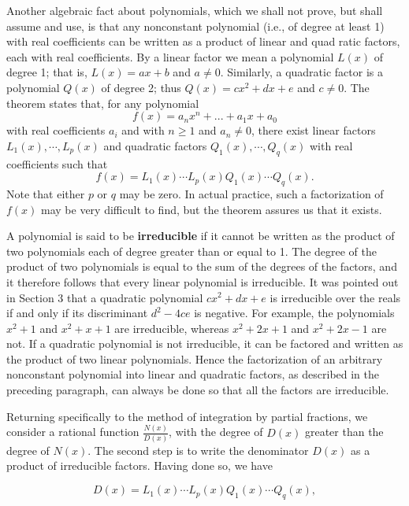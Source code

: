Another algebraic fact about polynomials, which we shall not prove, but shall assume and use, is that any nonconstant polynomial (i.e., of degree at least 1) with real coefficients can be written as a product of linear and quad
ratic factors, each with real coefficients. By a linear factor we mean a polynomial $L(x)$ of degree 1; that is, $L(x) = ax + b$ and $a \neq 0$. Similarly, a quadratic factor is a polynomial $Q(x)$ of degree 2; thus 
$Q(x) = cx^2 + dx + e$ and $c \neq 0$. The theorem states that, for any polynomial
$$
f(x) = a_{n}x^n + ... + a_{1}x + a_{0}
$$
\noindent with real coefficients $a_i$ and with $n \geq 1$ and $a_n \neq 0$, there exist linear factors $L_{1}(x), \cdots, L_{p}(x)$ and quadratic factors $Q_1(x), \cdots, Q_q(x)$ with real coefficients such that
$$
f(x)= L_1(x) \cdots L_p(x)Q_1(x) \cdots Q_q(x).
$$
\noindent Note that either $p$ or $q$ may be zero. In actual practice, such a factorization of $f(x)$ may be very difficult to find, but the theorem assures us that it exists.

A polynomial is said to be \textbf{irreducible} if it cannot be written as the product of two polynomials each of degree greater than or equal to 1. The degree of the product of two polynomials is equal to the sum of the degrees of the factors, and it therefore follows that every linear polynomial is irreducible. It was pointed out in Section 3 that a quadratic polynomial $cx^2 + dx + e$ is irreducible over the reals if and only if its discriminant $d^2 - 4ce$ is negative. For example, the polynomials $x^2 + 1$ and $x^2 + x + 1$ are irreducible, whereas $x^2 + 2x + 1$ and $x^2 + 2x - 1$ are not. If a quadratic polynomial is not irreducible, it can be factored and written as the product of two linear polynomials. Hence the factorization of an arbitrary nonconstant polynomial into linear and quadratic factors, as described in the preceding paragraph, can always be done so that all the factors are irreducible.

Returning specifically to the method of integration by partial fractions, we consider a rational function $\frac{N(x)}{D(x)}$, with the degree of $D(x)$ greater than the degree of $N(x)$. The second step is to write the denominator $D(x)$ as a product of irreducible factors. Having done so, we have

\begin{equation}
D(x) = L_1(x) \cdots L_p(x)Q_1(x) \cdots Q_q(x),   
\label{eq7.4.2}
\end{equation}

